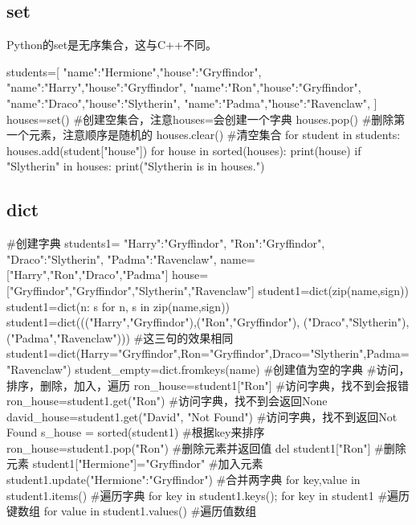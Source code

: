 \documentclass{article}
\begin{document}
    \subsection{set}
      Python的set是无序集合，这与C++不同。
      \begin{codeblock}[language=python, caption={basic operation of set}]
        students=[
          {"name":"Hermione","house":"Gryffindor"},
          {"name":"Harry","house":"Gryffindor"},
          {"name":"Ron","house":"Gryffindor"},
          {"name":"Draco","house":"Slytherin"},
          {"name":"Padma","house":"Ravenclaw"},
        ]
        houses=set() #创建空集合，注意houses={}会创建一个字典
        houses.pop() #删除第一个元素，注意顺序是随机的
        houses.clear() #清空集合
        for student in students:
          houses.add(student["house"])
        for house in sorted(houses):
          print(house)
        if "Slytherin" in houses:
          print("Slytherin is in houses.")
      \end{codeblock}

    \subsection{dict}
      \begin{codeblock}[language=python, caption={basic operation of dictionary}]
        #创建字典
        students1={
          "Harry":"Gryffindor",
          "Ron":"Gryffindor",
          "Draco":"Slytherin",
          "Padma":"Ravenclaw",
        }
        name=["Harry","Ron","Draco","Padma"]
        house=["Gryffindor","Gryffindor","Slytherin","Ravenclaw"]
        student1=dict(zip(name,sign)) 
        student1=dict(n: s for n, s in zip(name,sign))
        student1=dict((("Harry","Gryffindor"),("Ron","Gryffindor"),
            ("Draco","Slytherin"),("Padma","Ravenclaw"))) #这三句的效果相同
        student1=dict(Harry="Gryffindor",Ron="Gryffindor",Draco="Slytherin",Padma="Ravenclaw")
        student_empty=dict.fromkeys(name) #创建值为空的字典
        #访问，排序，删除，加入，遍历
        ron_house=student1["Ron"] #访问字典，找不到会报错
        ron_house=student1.get("Ron") #访问字典，找不到会返回None
        david_house=student1.get("David", "Not Found") #访问字典，找不到返回Not Found
        s_house = sorted(student1) #根据key来排序
        ron_house=student1.pop("Ron") #删除元素并返回值
        del student1["Ron"] #删除元素
        student1["Hermione"]="Gryffindor" #加入元素
        student1.update({"Hermione":"Gryffindor"}) #合并两字典
        for key,value in student1.items() #遍历字典
        for key in student1.keys(); for key in student1 #遍历键数组
        for value in student1.values() #遍历值数组
      \end{codeblock}
\end{document}

